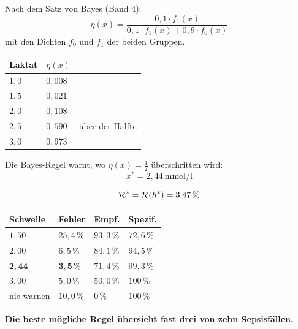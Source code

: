 \begin{merksatz}
Nach dem Satz von Bayes (Band 4):
\[ \eta(x) = \frac{0{,}1\cdot f_1(x)}{0{,}1\cdot f_1(x) + 0{,}9\cdot f_0(x)} \]
mit den Dichten $f_0$ und $f_1$ der beiden Gruppen.

\begin{center}
{\small
\renewcommand{\arraystretch}{1.48}
\begin{tabular}{@{}P{2.2cm}P{2.2cm}P{3.2cm}@{}}
\toprule
\textbf{Laktat} & $\eta(x)$ & \\
\midrule
$1{,}0$ & $0{,}008$ & \\
$1{,}5$ & $0{,}021$ & \\
$2{,}0$ & $0{,}108$ & \\
$2{,}5$ & $0{,}590$ & \textcolor{akzent}{über der Hälfte}\\
$3{,}0$ & $0{,}973$ & \\
\bottomrule
\end{tabular}}
\end{center}

Die Bayes-Regel warnt, wo $\eta(x) = \tfrac12$ überschritten wird:
\[ x^{*} = 2{,}44 \ \text{mmol/l} \]

\[ \mathcal{R}^{*} = \mathcal{R}(h^{*}) = 3{,}47\,\% \]

\begin{center}
{\small
\renewcommand{\arraystretch}{1.5}
\begin{tabular}{@{}P{2.4cm}P{1.8cm}P{2.0cm}P{2.0cm}@{}}
\toprule
\textbf{Schwelle} & \textbf{Fehler} & \textbf{Empf.} & \textbf{Spezif.}\\
\midrule
$1{,}50$ & $25{,}4\,\%$ & $93{,}3\,\%$ & $72{,}6\,\%$\\
$2{,}00$ & $6{,}5\,\%$ & $84{,}1\,\%$ & $94{,}5\,\%$\\
$\mathbf{2{,}44}$ & $\mathbf{3{,}5\,\%}$ & $71{,}4\,\%$ & $99{,}3\,\%$\\
$3{,}00$ & $5{,}0\,\%$ & $50{,}0\,\%$ & $100\,\%$\\
\midrule
nie warnen & $10{,}0\,\%$ & $0\,\%$ & $100\,\%$\\
\bottomrule
\end{tabular}}
\end{center}

\begin{center}
\begin{minipage}{0.9\textwidth}
\textbf{Die beste mögliche Regel übersieht fast drei von zehn Sepsisfällen.}
\end{minipage}
\end{center}


\end{merksatz}
